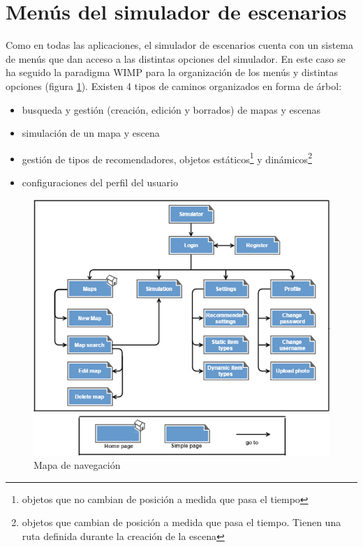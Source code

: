 \section{Menús del simulador de escenarios}


Como en todas las aplicaciones, el simulador de escenarios cuenta con un sistema de menús que dan acceso a las distintas opciones del simulador. En este caso se ha seguido la paradigma WIMP para la organización de los menús y distintas opciones (figura \ref{mapaNavegacion}). Existen 4 tipos de caminos organizados en forma de árbol:

\begin{itemize}
	\item busqueda y gestión (creación, edición y borrados) de mapas y escenas
	\item simulación de un mapa y escena
	\item gestión de tipos de recomendadores, objetos estáticos\footnote{objetos que no cambian de posición a medida que pasa el tiempo} y dinámicos\footnote{objetos que cambian de posición a medida que pasa el tiempo. Tienen una ruta definida durante la creación de la escena}
	\item configuraciones del perfil del usuario
\end{itemize} 

\begin{figure}[H]
\centering\includegraphics[scale=0.7]{imagenes/mapa-navegacion.png}
\caption{Mapa de navegación}
\label{mapaNavegacion}
\end{figure}

